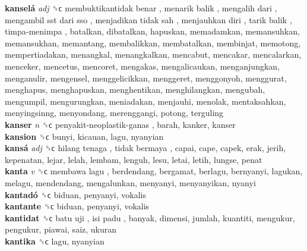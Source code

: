 \textbf{kanselá} \emph{adj}  ␝ϲ   membuktikantidak benar ,  menarik balik ,  mengalih dari ,  mengambil sst dari sso ,  menjadikan tidak sah ,  menjauhkan diri ,  tarik balik ,  timpa-menimpa , batalkan, dibatalkan, hapuskan, memadamkan, memansuhkan, memansukhan, memantang, membalikkan, membatalkan, membinjat, memotong, mempertiadakan, menangkal, menangkalkan, mencabut, mencakar, mencalarkan, menceker, mencetus, mencoret, mengakas, mengalicaukan, menganjungkan, menganulir, mengensel, menggelicikkan, menggeret, menggonyoh, menggurat, menghapus, menghapuskan, menghentikan, menghilangkan, mengubah, mengumpil, mengurungkan, meniadakan, menjauhi, menolak, mentaksahkan, menyingsinng, menyondang, merenggangi, potong, terguling  \\
\textbf{kanser} \emph{n}  ␝ϲ   penyakit-neoplastik-ganas , barah, kanker, kanser  \\
\textbf{kansion} ␝ϲ  bunyi, kicauan, lagu, nyanyian  \\
\textbf{kansá} \emph{adj}  ␝ϲ   hilang tenaga ,  tidak bermaya , capai, cape, capek, erak, jerih, kepenatan, lejar, lelah, lembam, lenguh, lesu, letai, letih, lungse, penat  \\
\textbf{kanta} \emph{v}  ␝ϲ   membawa lagu , berdendang, bergamat, berlagu, bernyanyi, lagukan, melagu, mendendang, mengalunkan, menyanyi, menyanyikan, nyanyi  \\
\textbf{kantadó} ␝ϲ  biduan, penyanyi, vokalis  \\
\textbf{kantante} ␝ϲ  biduan, penyanyi, vokalis  \\
\textbf{kantidat} ␝ϲ   batu uji ,  isi padu , banyak, dimensi, jumlah, kuantiti, mengukur, pengukur, piawai, saiz, ukuran  \\
\textbf{kantika} ␝ϲ  lagu, nyanyian  \\
